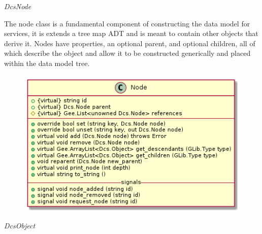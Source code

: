       \emph{DcsNode}

      \vspace*{-0.75cm}
      \begin{minipage}[t]{0.5\textwidth}
      	\vspace*{0.5cm}
        The node class is a fundamental component of constructing the data model
        for services, it is extends a tree map ADT and is meant to contain other
        objects that derive it. Nodes have properties, an optional parent, and
        optional children, all of which describe the object and allow it to be
        constructed generically and placed within the data model tree.
      \end{minipage} \hfill
      \begin{minipage}[t]{0.45\textwidth}
        \begin{figure}[H]
          \includegraphics[width=\textwidth]{figures/design/class/core/node}
          \label{fig:dsg-classes-node}
        \end{figure}
      \end{minipage}

      \emph{DcsObject}

